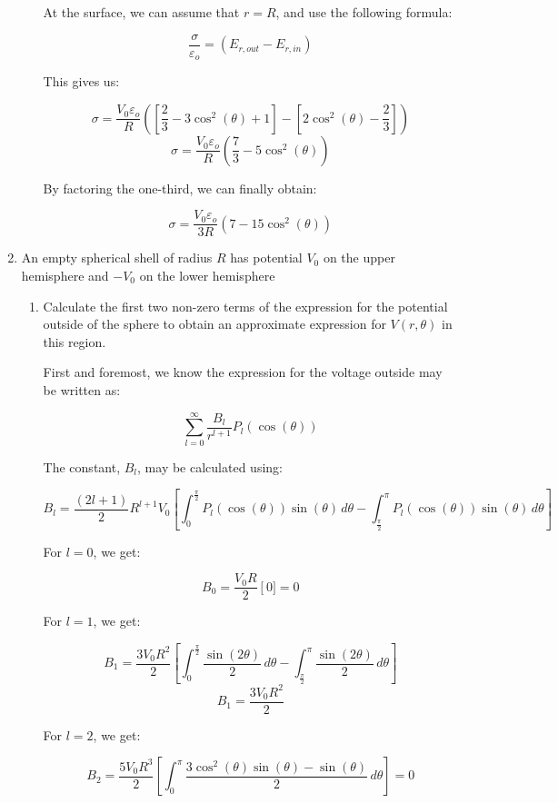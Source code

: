\begin{enumerate}
\begin{enumerate}
        At the surface, we can assume that $r=R$, and use the following formula:

        $$\frac{\sigma }{\varepsilon_o}=\left( E_{r,out}-E_{r,in} \right)$$

        This gives us:

        $$\sigma=\frac{V_0\varepsilon_o}{R}\left( \left[ \frac{2}{3}-3\cos^2(\theta)+1\right]-\left[  2\cos^2(\theta)-\frac{2}{3}\right]\right)$$
        $$\sigma=\frac{V_0\varepsilon_o}{R}\left( \frac{7}{3}-5\cos^2(\theta)\right)$$

        By factoring the one-third, we can finally obtain:

        $$\sigma=\frac{V_0\varepsilon_o}{3R}\left( 7-15\cos^2(\theta)\right)$$

    \end{enumerate}

  \item An empty spherical shell of radius $R$ has potential $V_0$ on the upper hemisphere and $−V_0$ on the lower hemisphere

    \begin{enumerate}

      \item Calculate the first two non-zero terms of the expression for the potential outside of the sphere to obtain an approximate expression for $V(r, \theta)$ in this region.

        First and foremost, we know the expression for the voltage outside may be written as:

        $$\sum_{l=0}^{\infty}\frac{B_l}{r^{l+1}}P_l(\cos(\theta))$$

        The constant, $B_l$, may be calculated using:

        $$B_l=\frac{(2l+1)}{2}R^{l+1}V_0\left[ \int_0^{\frac{\pi}{2}}P_l(\cos(\theta))\sin(\theta)\,d\theta-\int_{\frac{\pi}{2}}^\pi P_l(\cos(\theta))\sin(\theta)\,d\theta \right]$$

        For $l=0$, we get:

        $$B_0=\frac{V_0R}{2}\left[0]=0$$

        For $l=1$, we get:

        $$B_1=\frac{3V_0R^2}{2}\left[ \int_0^{\frac{\pi}{2}}\frac{\sin(2\theta)}{2}\,d\theta-\int_{\frac{\pi}{2}}^{\pi}\frac{\sin(2\theta)}{2}\,d\theta \right]$$
        $$B_1=\frac{3V_0R^2}{2}$$

        For $l=2$, we get:

        $$B_2=\frac{5V_0R^3}{2}\left[  \int_0^{\pi}\frac{3\cos^2(\theta)\sin(\theta)-\sin(\theta)}{2}\,d\theta\right]=0$$


\end{enumerate}
\end{enumerate}
